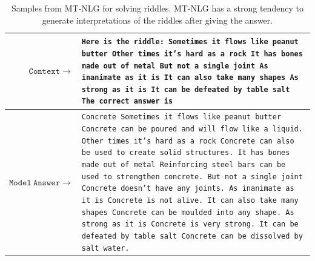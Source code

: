 \documentclass[11pt]{article}
\newcommand{\ours}{MT-NLG}
\begin{document}
\begin{table}[t]
\centering
\small
\begin{tabularx}{\textwidth}{rX}
 \toprule
 \textbf{$\mathtt{Context \rightarrow}$} & \texttt{Here is the riddle:\newline
Sometimes it flows like peanut butter\newline
Other times it’s hard as a rock\newline
It has bones made out of metal\newline
But not a single joint\newline
As inanimate as it is\newline
It can also take many shapes\newline
As strong as it is\newline
It can be defeated by table salt\newline
The correct answer is}
 \\
 \midrule
\textbf{$\mathtt{Model~Answer \rightarrow}$} &  \texttt{Concrete\newline
Sometimes it flows like peanut butter\newline
Concrete can be poured and will flow like a liquid.\newline
Other times it's hard as a rock\newline
Concrete can also be used to create solid structures.\newline
It has bones made out of metal\newline
Reinforcing steel bars can be used to strengthen concrete.\newline
But not a single joint\newline
Concrete doesn't have any joints.\newline
As inanimate as it is\newline
Concrete is not alive.\newline
It can also take many shapes\newline
Concrete can be moulded into any shape.\newline
As strong as it is\newline
Concrete is very strong.\newline
It can be defeated by table salt\newline
Concrete can be dissolved by salt water.}
 \\
\bottomrule
\end{tabularx}
\caption{Samples from {\ours} for solving riddles. {\ours} has a strong tendency to generate interpretations of the riddles after giving the answer.}
\label{tab:riddles-samples}
\end{table}
\end{document}
